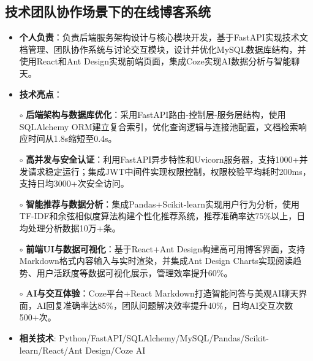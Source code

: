 \subsection{\textbf{技术团队协作场景下的在线博客系统} \hspace{2cm}{2025.06 -- 2025.07}}
  \begin{normalsize}
    \begin{itemize}
    \item \textbf{个人负责}：负责后端服务架构设计与核心模块开发，基于FastAPI实现技术文档管理、团队协作系统与讨论交互模块，设计并优化MySQL数据库结构，并使用React和Ant Design实现前端页面，集成Coze实现AI数据分析与智能聊天。
    \item \textbf{技术亮点}：
    \setlength{\itemindent}{1em} %
      \item[$\circ$] \textbf{后端架构与数据库优化}：采用FastAPI路由-控制层-服务层结构，使用SQLAlchemy ORM建立复合索引，优化查询逻辑与连接池配置，文档检索响应时间从1.8s缩短至0.4s。
      \item[$\circ$] \textbf{高并发与安全认证}：利用FastAPI异步特性和Uvicorn服务器，支持1000+并发请求稳定运行；集成JWT中间件实现权限控制，权限校验平均耗时200ms，支持日均3000+次安全访问。
      \item[$\circ$] \textbf{智能推荐与数据分析}：集成Pandas+Scikit-learn实现用户行为分析，使用TF-IDF和余弦相似度算法构建个性化推荐系统，推荐准确率达75\%以上，日均处理分析数据10万+条。
      \item[$\circ$] \textbf{前端UI与数据可视化}：基于React+Ant Design构建高可用博客界面，支持Markdown格式内容输入与实时渲染，并集成Ant Design Charts实现阅读趋势、用户活跃度等数据可视化展示，管理效率提升60\%。
      \item[$\circ$] \textbf{AI与交互体验}：Coze平台+React Markdown打造智能问答与美观AI聊天界面，AI回复准确率达85\%，团队问题解决效率提升40\%，日均AI交互次数500+次。
    \setlength{\itemindent}{0em} %
    \item \textbf{相关技术}: Python/FastAPI/SQLAlchemy/MySQL/Pandas/Scikit-learn/React/Ant Design/Coze AI
    \end{itemize}
  \end{normalsize}